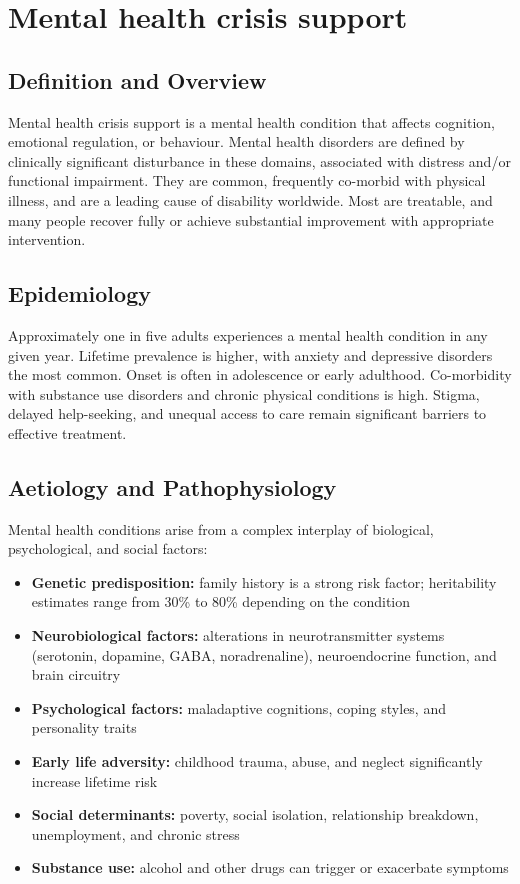 \chapter{Mental health crisis support}

\section*{Definition and Overview}
Mental health crisis support is a mental health condition that affects cognition, emotional regulation, or behaviour. Mental health disorders are defined by clinically significant disturbance in these domains, associated with distress and/or functional impairment. They are common, frequently co-morbid with physical illness, and are a leading cause of disability worldwide. Most are treatable, and many people recover fully or achieve substantial improvement with appropriate intervention.

\section*{Epidemiology}
Approximately one in five adults experiences a mental health condition in any given year. Lifetime prevalence is higher, with anxiety and depressive disorders the most common. Onset is often in adolescence or early adulthood. Co-morbidity with substance use disorders and chronic physical conditions is high. Stigma, delayed help-seeking, and unequal access to care remain significant barriers to effective treatment.

\section*{Aetiology and Pathophysiology}
Mental health conditions arise from a complex interplay of biological, psychological, and social factors:

\begin{itemize}
    \item \textbf{Genetic predisposition:} family history is a strong risk factor; heritability estimates range from 30\% to 80\% depending on the condition
    \item \textbf{Neurobiological factors:} alterations in neurotransmitter systems (serotonin, dopamine, GABA, noradrenaline), neuroendocrine function, and brain circuitry
    \item \textbf{Psychological factors:} maladaptive cognitions, coping styles, and personality traits
    \item \textbf{Early life adversity:} childhood trauma, abuse, and neglect significantly increase lifetime risk
    \item \textbf{Social determinants:} poverty, social isolation, relationship breakdown, unemployment, and chronic stress
    \item \textbf{Substance use:} alcohol and other drugs can trigger or exacerbate symptoms
\end{itemize}


